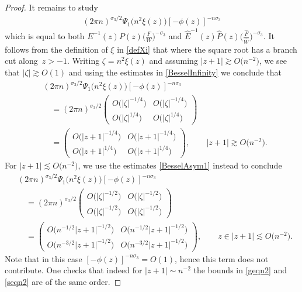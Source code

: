 \documentclass[10pt,a4paper]{amsart}
\newcommand{\bP}{P}
\newcommand{\hP}{{\widehat P}}
\newcommand{\hF}{\widehat F}
\newcommand{\E}{\mathrm{e}}
\numberwithin{equation}{section}
\begin{document}
\begin{proof}
It remains to study
\begin{align*}
 (2\pi n)^{\sigma_3/2}\Psi_1\big(n^2 \xi(z)\big)[-\phi(z)]^{-n\sigma_3}
\end{align*}
which is equal to both $E^{-1}(z)\bP(z)\big(\frac{F}{W}\big)^{-\sigma_3}$ and $\widehat E^{-1}(z)\hP(z)\big(\frac{\hF}{\widehat W}\big)^{-\sigma_3}$. It follows from the definition of $\xi$ in \eqref{defXi} that \smash{$[-\phi(z)]^{-n\sigma_3} =\E^{-2\sqrt{n^2 \xi(z)}\sigma_3}$} where the square root has a branch cut along~$z > -1$. Writing $\zeta=n^2 \xi(z)$ and assuming $|z+1| \gtrsim O\big(n^{-2}\big)$, we see that $|\zeta| \gtrsim O(1)$ and using the estimates in \eqref{BesselInfinity} we conclude that
\begin{align}\nonumber
& (2\pi n)^{\sigma_3/2}\Psi_1\big(n^2 \xi(z)\big)[-\phi(z)]^{-n\sigma_3} \\
&\quad= (2\pi n)^{\sigma_3/2}\begin{pmatrix}
 O\big(|\zeta|^{-1/4}\big) & O\big(|\zeta|^{-1/4}\big)
 \\
 O\big(|\zeta|^{1/4}\big) & O\big(|\zeta|^{1/4}\big)
 \end{pmatrix}\nonumber
 \\
 &\quad=
 \begin{pmatrix}
 O\big(|z+1|^{-1/4}\big) & O\big(|z+1|^{-1/4}\big)
 \\
 O\big(|z+1|^{1/4}\big) & O\big(|z+1|^{1/4}\big)
 \end{pmatrix}, \qquad |z+1| \gtrsim O\big(n^{-2}\big).\label{geqn2}
\end{align}
For $|z+1| \lesssim O\big(n^{-2}\big)$, we use the estimates \eqref{BesselAsym1} instead to conclude
\begin{align}
 &(2\pi n)^{\sigma_3/2}\Psi_1\big(n^2 \xi(z)\big)[-\phi(z)]^{-n\sigma_3} \nonumber\\
 &\quad= (2\pi n)^{\sigma_3/2}\begin{pmatrix}
 O\big(|\zeta|^{-1/2}\big) & O\big(|\zeta|^{-1/2}\big)
 \\
 O\big(|\zeta|^{-1/2}\big) & O\big(|\zeta|^{-1/2}\big)
 \end{pmatrix}\nonumber\\
&\quad= \begin{pmatrix}
 O\big(n^{-1/2}|z+1|^{-1/2}\big) & O\big(n^{-1/2}|z+1|^{-1/2}\big)
 \\
 O\big(n^{-3/2}|z+1|^{-1/2}\big) & O\big(n^{-3/2}|z+1|^{-1/2}\big)
 \end{pmatrix}, \qquad z \in |z+1| \lesssim O\big(n^{-2}\big).\label{seqn2}
\end{align}
Note that in this case $[-\phi(z)]^{-n\sigma_3} = O(1)$, hence this term does not contribute. One checks that indeed for $|z+1| \sim n^{-2}$ the bounds in \eqref{geqn2} and \eqref{seqn2} are of the same order.


\end{proof}
\end{document}
